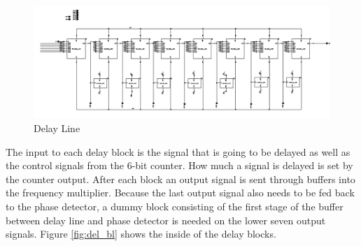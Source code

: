 \documentclass[a4paper,12pt]{article} \usepackage{graphicx}
\begin{document}
\begin{figure}[h]
        \centering
        \includegraphics[width=\textwidth]{../Bilder/Delay_Line/Delay_line_top.png}
        \caption{Delay Line}
        \label{fig:del_line}
\end{figure}
The input to each delay block is the signal that is going
to be delayed as well as the control signals from the 6-bit counter. How much a signal
is delayed is set by the counter output. After each block an output signal is sent
through buffers into the frequency multiplier. Because the last output signal
also needs to be fed back to the phase detector, a dummy block consisting of the
first stage of the buffer between delay line and phase detector is needed on
the lower seven output signals. Figure \ref{fig:del_bl} shows the inside of
the delay blocks.
\end{document}
